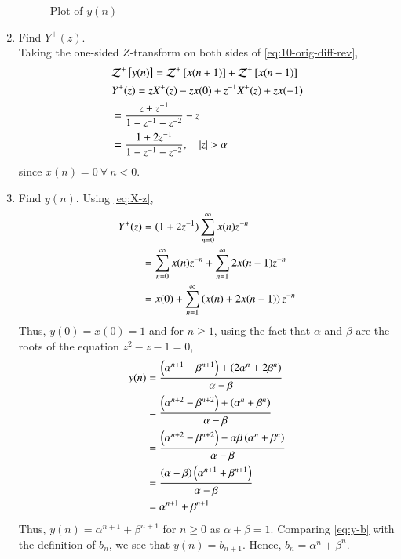 \documentclass[journal,12pt,twocolumn]{IEEEtran}
\renewcommand\thesection{\arabic{section}}
\begin{document}
\begin{enumerate}[label=\thesection.\arabic*,ref=\thesection.\theenumi]
\begin{figure}[!htbp]
    \caption{Plot of $y(n)$}
    \label{fig:yn}
\end{figure}
\item Find $Y^{+}(z)$. 
\\
\solution Taking the one-sided $Z$-transform on both sides of \eqref{eq:10-orig-diff-rev},
\begin{align}
&\mathcal{Z}^+{}\left[y(n)\right] = \mathcal{Z}^+{}\left[x(n + 1)\right] + \mathcal{Z}^+{}\left[x(n - 1)\right] \\
&Y^+(z) = zX^+(z) - zx(0) + z^{-1}X^+(z) + zx(-1) \\
&= \frac{z + z^{-1}}{1 - z^{-1} - z^{-2}} - z \\
&= \frac{1 + 2z^{-1}}{1 - z^{-1} - z^{-2}}, \quad |z| > \alpha
\end{align}
since $x(n) = 0\ \forall\ n < 0$.
\item Find $y(n)$.
    \label{pr:1-3}
\solution Using \eqref{eq:X-z},
\begin{align}
    Y^+(z) &= (1 + 2z^{-1})\sum_{n = 0}^{\infty}x(n)z^{-n} \\
           &= \sum_{n = 0}^{\infty}x(n)z^{-n} + \sum_{n = 1}^{\infty}2x(n - 1)z^{-n} \\
           &= x(0) + \sum_{n = 1}^{\infty}\left(x(n) + 2x(n - 1)\right)z^{-n}
\end{align}
Thus, $y(0) = x(0) = 1$ and for $n \ge 1$, using the fact that $\alpha$ and 
$\beta$ are the roots of the equation $z^2 - z - 1 = 0$,
\begin{align}
    y(n) &= \frac{\left(\alpha^{n + 1} - \beta^{n + 1}\right) + \left(2\alpha^n + 2\beta^n\right)}{\alpha - \beta} \\
         &= \frac{\left(\alpha^{n + 2} - \beta^{n + 2}\right) + \left(\alpha^{n} + \beta^{n}\right)}{\alpha - \beta} \label{eq:y-b} \\
         &= \frac{\left(\alpha^{n + 2} - \beta^{n + 2}\right) - \alpha\beta\left(\alpha^{n} + \beta^{n}\right)}{\alpha - \beta} \\
         &= \frac{\left(\alpha - \beta\right)\left(\alpha^{n + 1} + \beta^{n + 1}\right)}{\alpha - \beta} \\
         &= \alpha^{n + 1} + \beta^{n + 1}
\end{align}
Thus, $y(n) = \alpha^{n + 1} + \beta^{n + 1}$ for $n \geq 0$ as $\alpha + \beta = 1$.
Comparing \eqref{eq:y-b} with the definition of $b_n$, we see that $y(n) = b_{n + 1}$.
Hence, $b_n = \alpha^n + \beta^n$.
\end{enumerate}
\end{document}
